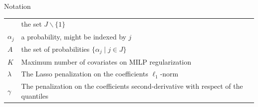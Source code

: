 \begin{frame}{Notation}
\begin{longtable}[]{@{}ll@{}}
\begin{minipage}[t]{0.14\columnwidth}
\end{minipage} & \begin{minipage}[t]{0.80\columnwidth}\raggedright\strut
the set \(J\backslash \{1\}\)\strut
\end{minipage}\tabularnewline
\begin{minipage}[t]{0.14\columnwidth}\raggedright\strut
\(\alpha_j\)\strut
\end{minipage} & \begin{minipage}[t]{0.80\columnwidth}\raggedright\strut
a probability, might be indexed by \(j\)\strut
\end{minipage}\tabularnewline
\begin{minipage}[t]{0.14\columnwidth}\raggedright\strut
\(A\)\strut
\end{minipage} & \begin{minipage}[t]{0.80\columnwidth}\raggedright\strut
the set of probabilities \(\{\alpha_j \mid j \in J\}\)\strut
\end{minipage}\tabularnewline
\begin{minipage}[t]{0.14\columnwidth}\raggedright\strut
\(K\)\strut
\end{minipage} & \begin{minipage}[t]{0.80\columnwidth}\raggedright\strut
Maximum number of covariates on MILP regularization\strut
\end{minipage}\tabularnewline
\begin{minipage}[t]{0.14\columnwidth}\raggedright\strut
\(\lambda\)\strut
\end{minipage} & \begin{minipage}[t]{0.80\columnwidth}\raggedright\strut
The Lasso penalization on the coefficients \(\ell_1\)-norm\strut
\end{minipage}\tabularnewline
\begin{minipage}[t]{0.14\columnwidth}\raggedright\strut
\(\gamma\)\strut
\end{minipage} & \begin{minipage}[t]{0.80\columnwidth}\raggedright\strut
The penalization on the coefficients second-derivative with respect of
the quantiles\strut
\end{minipage}\tabularnewline
\bottomrule
\end{longtable}

\end{frame}

